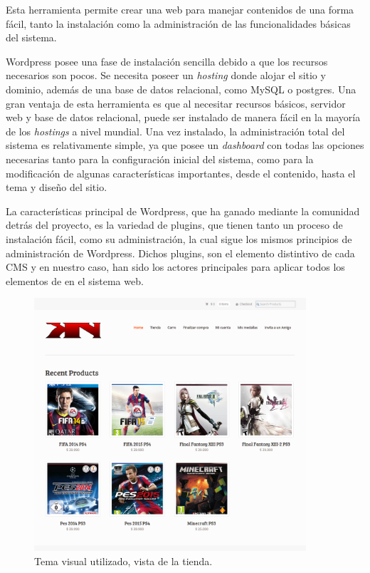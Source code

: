 Esta herramienta permite crear una web para manejar contenidos de una forma fácil,
tanto la instalación como la administración de las funcionalidades básicas del sistema.

Wordpress posee una fase de instalación sencilla debido a que los recursos
necesarios son pocos. Se necesita poseer un \emph{hosting} donde alojar el sitio y
dominio, además de una base de datos relacional, como MySQL o postgres.
Una gran ventaja de esta herramienta es que al necesitar recursos básicos,
servidor web y base de datos relacional, puede ser instalado de manera fácil en la
mayoría de los \emph{hostings} a nivel mundial.
Una vez instalado, la administración total del sistema es relativamente simple,
ya que posee un \emph{dashboard} con todas las opciones necesarias
tanto para la configuración inicial del sistema, como para la modificación
de algunas características importantes, desde el contenido, hasta el tema
y diseño del sitio.

La características principal de Wordpress, que ha ganado mediante
la comunidad detrás del proyecto, es la variedad de plugins, que
tienen tanto un proceso de instalación fácil, como su administración,
la cual sigue los mismos principios de administración de Wordpress.
Dichos plugins, son el elemento distintivo de cada CMS
y en nuestro caso, han sido los actores principales para aplicar
todos los elementos de {\GAM} en el sistema web.

\begin{figure}[!htb]
  \centering
  \includegraphics[width=0.9\textwidth]{images/Tienda/Tienda.png}
  \caption[TemaVisual]{Tema visual utilizado, vista de la tienda.}
  \label{fig:Players}
\end{figure}



